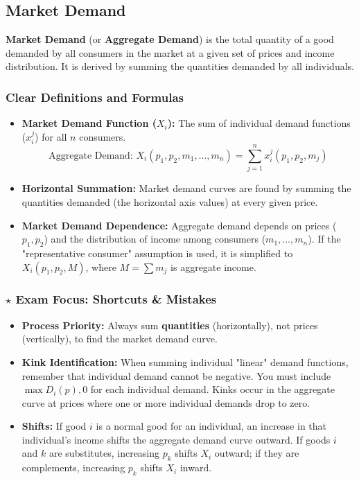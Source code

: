 \documentclass{article}
\begin{document}
\subsection{Market Demand}

\textbf{Market Demand} (or \textbf{Aggregate Demand}) is the total quantity of a good demanded by all consumers in the market at a given set of prices and income distribution. It is derived by summing the quantities demanded by all individuals.

\subsubsection*{Clear Definitions and Formulas}
\begin{itemize}
    \item \textbf{Market Demand Function ($X_i$):} The sum of individual demand functions ($x_{i}^j$) for all $n$ consumers. 
    \[\text{Aggregate Demand: } X_i(p_1, p_2, m_1, \dots, m_n) = \sum_{j=1}^{n} x_{i}^j(p_1, p_2, m_j)\]
    \item \textbf{Horizontal Summation:} Market demand curves are found by summing the quantities demanded (the horizontal axis values) at every given price.
    \item \textbf{Market Demand Dependence:} Aggregate demand depends on prices ($p_1, p_2$) and the distribution of income among consumers ($m_1, \dots, m_n$). If the "representative consumer" assumption is used, it is simplified to $X_i(p_1, p_2, M)$, where $M = \sum m_j$ is aggregate income.
\end{itemize}

\subsubsection*{$\star$ Exam Focus: Shortcuts \& Mistakes}
\begin{itemize}
    \item \textbf{Process Priority:} Always sum \textbf{quantities} (horizontally), not prices (vertically), to find the market demand curve.
    \item \textbf{Kink Identification:} When summing individual "linear" demand functions, remember that individual demand cannot be negative. You must include $\max{D_i(p), 0}$ for each individual demand. Kinks occur in the aggregate curve at prices where one or more individual demands drop to zero.
    \item \textbf{Shifts:} If good $i$ is a normal good for an individual, an increase in that individual's income shifts the aggregate demand curve outward. If goods $i$ and $k$ are substitutes, increasing $p_k$ shifts $X_i$ outward; if they are complements, increasing $p_k$ shifts $X_i$ inward.
\end{itemize}
\end{document}
